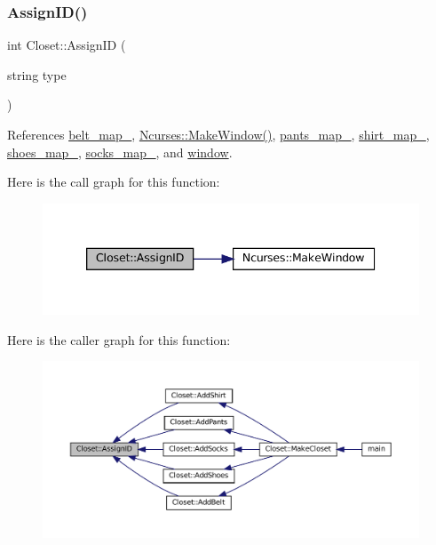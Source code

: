 \subsubsection{\texorpdfstring{Assign\+I\+D()}{AssignID()}}
{\footnotesize\ttfamily int Closet\+::\+Assign\+ID (\begin{DoxyParamCaption}\item[{string}]{type }\end{DoxyParamCaption})\hspace{0.3cm}{\ttfamily [private]}}



References \mbox{\hyperlink{classCloset_a0631fe46e3c955109a613e1cd1d2cb52}{belt\+\_\+map\+\_\+}}, \mbox{\hyperlink{classNcurses_a1d8def11419a444c5696b5043da680d4}{Ncurses\+::\+Make\+Window()}}, \mbox{\hyperlink{classCloset_a8be78859dfab9e2aa09bfbbb8f191dab}{pants\+\_\+map\+\_\+}}, \mbox{\hyperlink{classCloset_a8126a023a2777b84b23436da8d1f4b35}{shirt\+\_\+map\+\_\+}}, \mbox{\hyperlink{classCloset_ab1e1ce9110a044c90244407f0f6f92c4}{shoes\+\_\+map\+\_\+}}, \mbox{\hyperlink{classCloset_a33a48dfc5ef542261bb0dd373f899f9e}{socks\+\_\+map\+\_\+}}, and \mbox{\hyperlink{classCloset_af1eb4f786cc4eccd3018b90632236a93}{window}}.

Here is the call graph for this function\+:\nopagebreak
\begin{figure}[H]
\begin{center}
\leavevmode
\includegraphics[width=339pt]{classCloset_afabc27d621abdf0089a6b3027ea8f470_cgraph}
\end{center}
\end{figure}
Here is the caller graph for this function\+:\nopagebreak
\begin{figure}[H]
\begin{center}
\leavevmode
\includegraphics[width=350pt]{classCloset_afabc27d621abdf0089a6b3027ea8f470_icgraph}
\end{center}
\end{figure}
\mbox{\label{classCloset_a108ab29dacfccd5d1c958d5ec88ad64f}} 
